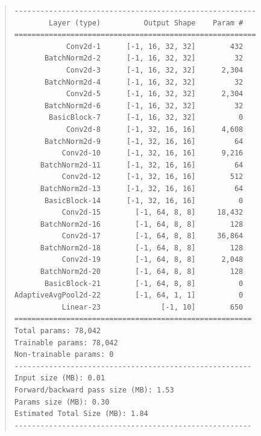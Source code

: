 \documentclass[letterpaper]{article} %
\begin{document}
\begin{quote}
\begin{scriptsize}\begin{verbatim}
--------------------------------------------------------
        Layer (type)          Output Shape    Param #
========================================================
            Conv2d-1      [-1, 16, 32, 32]        432
       BatchNorm2d-2      [-1, 16, 32, 32]         32
            Conv2d-3      [-1, 16, 32, 32]      2,304
       BatchNorm2d-4      [-1, 16, 32, 32]         32
            Conv2d-5      [-1, 16, 32, 32]      2,304
       BatchNorm2d-6      [-1, 16, 32, 32]         32
        BasicBlock-7      [-1, 16, 32, 32]          0
            Conv2d-8      [-1, 32, 16, 16]      4,608
       BatchNorm2d-9      [-1, 32, 16, 16]         64
           Conv2d-10      [-1, 32, 16, 16]      9,216
      BatchNorm2d-11      [-1, 32, 16, 16]         64
           Conv2d-12      [-1, 32, 16, 16]        512
      BatchNorm2d-13      [-1, 32, 16, 16]         64
       BasicBlock-14      [-1, 32, 16, 16]          0
           Conv2d-15        [-1, 64, 8, 8]     18,432
      BatchNorm2d-16        [-1, 64, 8, 8]        128
           Conv2d-17        [-1, 64, 8, 8]     36,864
      BatchNorm2d-18        [-1, 64, 8, 8]        128
           Conv2d-19        [-1, 64, 8, 8]      2,048
      BatchNorm2d-20        [-1, 64, 8, 8]        128
       BasicBlock-21        [-1, 64, 8, 8]          0
AdaptiveAvgPool2d-22        [-1, 64, 1, 1]          0
           Linear-23              [-1, 10]        650
=======================================================
Total params: 78,042
Trainable params: 78,042
Non-trainable params: 0
-------------------------------------------------------
Input size (MB): 0.01
Forward/backward pass size (MB): 1.53
Params size (MB): 0.30
Estimated Total Size (MB): 1.84
-------------------------------------------------------
\end{verbatim}\end{scriptsize}
\end{quote}
\end{document}
